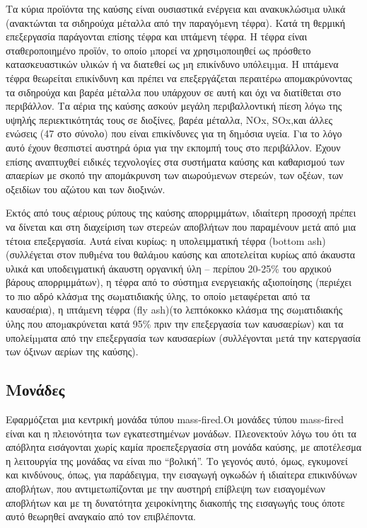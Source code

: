 \documentclass[12pt]{article}
\newcommand{\gr}{\selectlanguage{greek}}
\newcommand{\eng}{\selectlanguage{english}}
\begin{document}
 
 	Τα κύρια προϊόντα της καύσης είναι ουσιαστικά ενέργεια και ανακυκλώσιµα υλικά (ανακτώνται τα σιδηρούχα μέταλλα από την παραγόµενη τέφρα). Κατά τη θερμική επεξεργασία παράγονται επίσης τέφρα και ιπτάμενη τέφρα. Η τέφρα είναι σταθεροποιημένο προϊόν, το οποίο µπορεί να χρησιµοποιηθεί ως πρόσθετο κατασκευαστικών υλικών ή να διατεθεί ως µη επικίνδυνο υπόλειµµα. Η ιπτάμενα τέφρα θεωρείται επικίνδυνη και πρέπει να επεξεργάζεται περαιτέρω απομακρύνοντας τα σιδηρούχα και βαρέα μέταλλα που υπάρχουν σε αυτή και όχι να διατίθεται στο περιβάλλον. Τα αέρια της καύσης ασκούν μεγάλη περιβαλλοντική πίεση λόγω της υψηλής περιεκτικότητάς τους σε διοξίνες, βαρέα μέταλλα, \eng NOx, SOx,\gr και άλλες ενώσεις (47 στο σύνολο) που είναι επικίνδυνες για τη δηµόσια υγεία. Για το λόγο αυτό έχουν θεσπιστεί αυστηρά όρια για την εκπομπή τους στο περιβάλλον. Έχουν επίσης αναπτυχθεί ειδικές τεχνολογίες στα συστήματα καύσης και καθαρισμού των απαερίων με σκοπό την απομάκρυνση των αιωρούµενων στερεών, των οξέων, των οξειδίων του αζώτου και των διοξινών.
	
	 Εκτός από τους αέριους ρύπους της καύσης απορριμμάτων, ιδιαίτερη προσοχή πρέπει να δίνεται και στη διαχείριση των στερεών αποβλήτων που παραμένουν μετά από μια τέτοια επεξεργασία. Αυτά είναι κυρίως: η υπολειμματική τέφρα \eng(bottom ash)\gr (συλλέγεται στον πυθµένα του θαλάµου καύσης και αποτελείται κυρίως από άκαυστα υλικά και υποδειγματική άκαυστη οργανική ύλη – περίπου 20-25\% του αρχικού βάρους απορριμμάτων), η τέφρα από το σύστηµα ενεργειακής αξιοποίησης (περιέχει το πιο αδρό κλάσµα της σωµατιδιακής ύλης, το οποίο µεταφέρεται από τα καυσαέρια), η ιπτάµενη τέφρα \eng(fly ash)\gr (το λεπτόκοκκο κλάσµα της σωµατιδιακής ύλης που αποµακρύνεται κατά 95\% πριν την επεξεργασία των καυσαερίων) και τα υπολείµµατα από την επεξεργασία των καυσαερίων (συλλέγονται µετά την κατεργασία των όξινων αερίων της καύσης).
	 
	 \subsection{Μονάδες}
	 
	 Εφαρμόζεται μια κεντρική μονάδα τύπου \eng mass-fired.\gr Οι μονάδες τύπου mass-fired είναι και η πλειονότητα των εγκατεστημένων μονάδων. Πλεονεκτούν λόγω του ότι τα απόβλητα εισάγονται χωρίς καμία προεπεξεργασία στη μονάδα καύσης, με αποτέλεσμα η λειτουργία της μονάδας να είναι πιο “βολική”. Το γεγονός αυτό, όμως, εγκυμονεί και κινδύνους, όπως, για παράδειγμα, την εισαγωγή ογκωδών ή ιδιαίτερα επικινδύνων αποβλήτων, που αντιμετωπίζονται με την αυστηρή επίβλεψη των εισαγομένων αποβλήτων και με τη δυνατότητα χειροκίνητης διακοπής της εισαγωγής τους όποτε αυτό θεωρηθεί αναγκαίο από τον επιβλέποντα. 
	 
\end{document}
